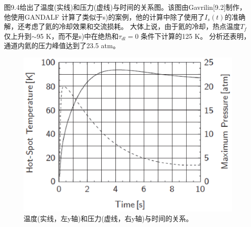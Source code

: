 图9.4给出了温度(实线)和压力(虚线)与时间的关系图。该图由Gavrilin[9.2]制作，他使用GANDALF
计算了类似于s)的案例，他的计算中除了使用了$I_s(t)$的准确解，还考虑了氦的冷却效果和交流损耗。
大体上说，由于氦的冷却，热点温度$T_f$仅上升到$\sim$95 K，而不是s)中在绝热和$\tau_{dl}=0$
条件下计算的125 K。
分析还表明，通道内氦的压力峰值达到了23.5 atm。
\begin{figure}[htbp]
	\centering
	\includegraphics[scale=0.6]{chpt9/figs/fig9.4.eps}
	\caption{温度(实线，左y轴)和压力(虚线，右y轴)与时间的关系。}
\end{figure}


